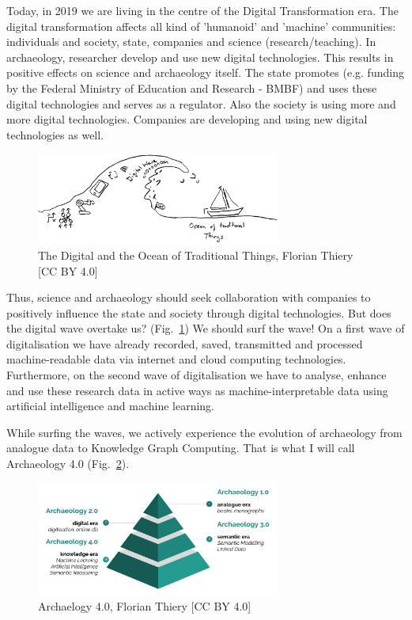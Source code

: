 \documentclass[twocolumn]{autart}
\begin{document}
Today, in 2019 we are living in the centre of the Digital Transformation era. The digital transformation affects all kind of 'humanoid' and 'machine' communities: individuals and society, state, companies and science (research/teaching). In archaeology, researcher develop and use new digital technologies. This results in positive effects on science and archaeology itself. The state promotes (e.g. funding by the Federal Ministry of Education and Research - BMBF) and uses these digital technologies and serves as a regulator. Also the society is using more and more digital technologies. Companies are developing and using new digital technologies as well.

\begin{figure}[!htb]
\begin{center}
\includegraphics[width=8cm]{Digital_Wave_and_the_Ocean_of_Traditional_Things.png}
\caption{The Digital and the Ocean of Traditional Things, Florian Thiery [CC BY 4.0]}
\label{figdigitalwave}
\end{center}
\end{figure}

Thus, science and archaeology should seek collaboration with companies to positively influence the state and society through digital technologies. But does the digital wave overtake us? (Fig.~\ref{figdigitalwave}) We should surf the wave! On a first wave of digitalisation we have already recorded, saved, transmitted and processed machine-readable data via internet and cloud computing technologies. Furthermore, on the second wave of digitalisation we have to analyse, enhance and use these research data in active ways as machine-interpretable data using artificial intelligence and machine learning.

While surfing the waves, we actively experience the evolution of archaeology from analogue data to Knowledge Graph Computing. That is what I will call Archaeology 4.0 (Fig.~\ref{figa40pyramid}).

\begin{figure}[!htb]
\begin{center}
\includegraphics[width=8cm]{Archaeology_40.png}    %
\caption{Archaelogy 4.0, Florian Thiery [CC BY 4.0]}  %
\label{figa40pyramid}                                 %
\end{center}                                 %
\end{figure}
\end{document}
